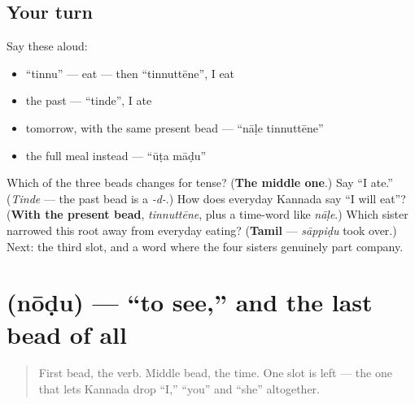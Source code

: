 \subsection*{Your turn}
Say these aloud:

\begin{itemize}
\raggedright
  \item \textquotedblleft{}tinnu\textquotedblright{} — eat — then \textquotedblleft{}tinnuttēne\textquotedblright{}, I eat
  \item the past — \textquotedblleft{}tinde\textquotedblright{}, I ate
  \item tomorrow, with the same present bead — \textquotedblleft{}nāḷe tinnuttēne\textquotedblright{}
  \item the full meal instead — \textquotedblleft{}ūṭa māḍu\textquotedblright{}
\end{itemize}

\begin{tcolorbox}[breakable,colback=teal!4,colframe=teal!35!black,title={Before you move on}]
Which of the three beads changes for tense? (\textbf{The middle one}.) Say \textquotedblleft{}I ate.\textquotedblright{} (\emph{Tinde} — the past bead is a \emph{-d-}.) How does everyday Kannada say \textquotedblleft{}I will eat\textquotedblright{}? (\textbf{With the present bead}, \emph{tinnuttēne}, plus a time-word like \emph{nāḷe}.) Which sister narrowed this root away from everyday eating? (\textbf{Tamil} — \emph{sāppiḍu} took over.) Next: the third slot, and a word where the four sisters genuinely part company.
\end{tcolorbox}
\section[\texorpdfstring{\kn{ನೋಡು} (nōḍu)}{ನೋಡು (nōḍu)}]{ (nōḍu) — \textquotedblleft{}to see,\textquotedblright{} and the last bead of all}

\label{lesson:KA-C32-noodu}



\begin{quote}
First bead, the verb. Middle bead, the time. One slot is left — the one that lets Kannada drop \textquotedblleft{}I,\textquotedblright{} \textquotedblleft{}you\textquotedblright{} and \textquotedblleft{}she\textquotedblright{} altogether.
\end{quote}

